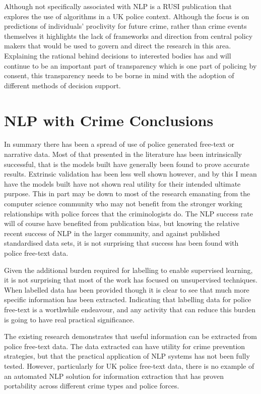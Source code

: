 Although not specifically associated with NLP  \textcite{babuta2018machine} is a RUSI publication that explores the use of algorithms in a UK police context. Although the focus is on predictions of individuals' proclivity for future crime, rather than crime events themselves it highlights the lack of frameworks and direction from central policy makers that would be used to govern and direct the research in this area. Explaining the rational behind decisions to interested bodies has and will continue to be an important part of transparency which is one part of policing by consent, this transparency needs to be borne in mind with the adoption of different methods of decision support. 

\section{ NLP with Crime Conclusions} In summary there has been a spread of use of police generated free-text or narrative data. Most of that presented in the literature has been intrinsically successful, that is the models built have generally been found to prove accurate results. Extrinsic validation has been less well shown however, and by this I mean have the models built have not shown real utility for their intended ultimate purpose.  This in part may be down to most of the research emanating from the computer science community who may not benefit from the stronger working relationships with police forces that the criminologists do. The NLP success rate will of course have benefited from publication bias, but knowing the relative recent success of NLP in the larger community, and against published standardised data sets,  it is not surprising that success has been found with police free-text data. 

Given the additional burden required for labelling to enable supervised learning, it is not surprising that most of the work has focused on unsupervised techniques. When labelled data has been provided though it is clear to see that much more specific information has been extracted. Indicating that labelling data for police free-text is a worthwhile endeavour, and any activity that can reduce this burden is going to have real practical significance. 

The existing research demonstrates that useful information can be extracted from police free-text data. The data extracted can have utility for crime prevention strategies, but that the practical application of NLP systems has not been fully tested. However, particularly for UK police free-text data, there is no example of an automated NLP solution for information extraction that has proven portability across different crime types and police forces.  



